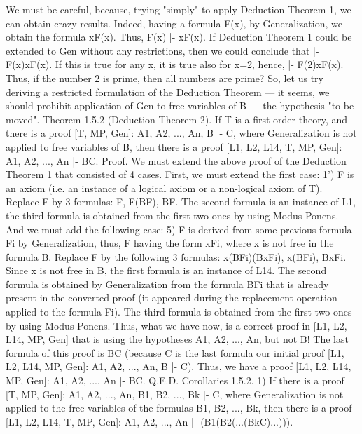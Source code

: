 We must be careful, because, trying "simply" to apply Deduction Theorem 1, we can obtain crazy results.
Indeed, having a formula F(x), by Generalization, we obtain the formula \forall xF(x). Thus, F(x) |- \forall xF(x). If
Deduction Theorem 1 could be extended to Gen without any restrictions, then we could conclude that |-
F(x)\IMPLIES \forall xF(x). If this is true for any x, it is true also for x=2, hence, |- F(2)\IMPLIES \forall xF(x). Thus, if the number
2 is prime, then all numbers are prime?
So, let us try deriving a restricted formulation of the Deduction Theorem --- it seems, we should prohibit
application of Gen to free variables of B --- the hypothesis "to be moved".
Theorem 1.5.2 (Deduction Theorem 2). If T is a first order theory, and there is a proof [T, MP, Gen]: A1,
A2, ..., An, B |- C, where Generalization is not applied to free variables of B, then there is a proof [L1, L2,
L14, T, MP, Gen]: A1, A2, ..., An |- B\IMPLIES C.
Proof. We must extend the above proof of the Deduction Theorem 1 that consisted of 4 cases. First, we
must extend the first case:
1') F is an axiom (i.e. an instance of a logical axiom or a non-logical axiom of T). Replace F by 3
formulas: F, F\IMPLIES (B\IMPLIES F), B\IMPLIES F. The second formula is an instance of L1, the third formula is obtained
from the first two ones by using Modus Ponens.
And we must add the following case:
5) F is derived from some previous formula Fi by Generalization, thus, F having the form \forall xFi, where x
is not free in the formula B. Replace F by the following 3 formulas:
\forall x(B\IMPLIES Fi)\IMPLIES (B\IMPLIES \forall xFi),
\forall x(B\IMPLIES Fi),
B\IMPLIES \forall xFi.
Since x is not free in B, the first formula is an instance of L14. The second formula is obtained by
Generalization from the formula B\IMPLIES Fi that is already present in the converted proof (it appeared during
the replacement operation applied to the formula Fi). The third formula is obtained from the first two ones
by using Modus Ponens.
Thus, what we have now, is a correct proof in [L1, L2, L14, MP, Gen] that is using the hypotheses A1,
A2, ..., An, but not B! The last formula of this proof is B\IMPLIES C (because C is the last formula our initial
proof [L1, L2, L14, MP, Gen]: A1, A2, ..., An, B |- C). Thus, we have a proof [L1, L2, L14, MP, Gen]: A1,
A2, ..., An |- B\IMPLIES C. Q.E.D.
Corollaries 1.5.2. 1) If there is a proof [T, MP, Gen]: A1, A2, ..., An, B1, B2, ..., Bk |- C, where
Generalization is not applied to the free variables of the formulas B1, B2, ..., Bk, then there is a proof [L1,
L2, L14, T, MP, Gen]: A1, A2, ..., An |- (B1\IMPLIES (B2\IMPLIES (...\IMPLIES (Bk\IMPLIES C)...))).

